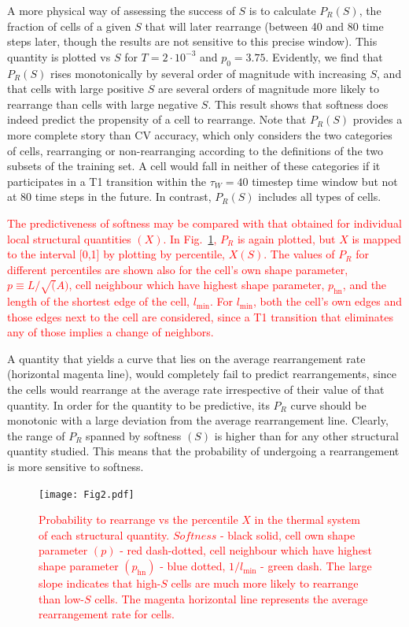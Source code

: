 \documentclass[twoside,twocolumn,9pt]{article}
\begin{document}
A more physical way of assessing the success of $S$ is to calculate $P_R(S)$, the fraction of cells of a given $S$ that will later rearrange (between 40 and 80 time steps later, though the results are not sensitive to this precise window). This quantity is plotted vs $S$ for $T=2 \cdot 10^{-3}$ and $p_0=3.75$. Evidently, we find that $P_R(S)$ rises monotonically by several order of magnitude with increasing $S$, and that cells with large positive $S$ are several orders of magnitude more likely to rearrange than cells with large negative $S$. This result shows that softness does indeed predict the propensity of a cell to rearrange. Note that
$P_R(S)$ provides a more complete story than CV accuracy, which only considers the two categories of cells, rearranging or non-rearranging according to the definitions of the two subsets of the training set.
A cell would fall in neither of these categories if it participates in a T1 transition within the $\tau_W=40$ timestep time window but not at 80 time steps in the future. In contrast, $P_R(S)$ includes all types of cells.

\textcolor{red}{
The predictiveness of softness may be compared with that obtained for individual local structural quantities $(X)$. In Fig.~\ref{Qpercentile}, $P_R$ is again plotted, but $X$ is mapped to the interval [0,1] by plotting by percentile, $X(S)$. The values of $P_R$ for different percentiles are shown also for the cell's own shape parameter, $p \equiv L / \sqrt(A)$, cell neighbour which have highest shape parameter, 
$p_\text{hn}$, and the length of the shortest edge of the cell, $l_\text{min}$. For $l_\text{min}$, both the cell's own edges and those edges next to the cell are considered, since a T1 transition that eliminates any of those implies a change of neighbors.}

A quantity that yields a curve that lies on the average rearrangement rate (horizontal magenta line), would completely fail to predict rearrangements, since the cells would rearrange at the average rate irrespective of their value of that quantity. In order for the quantity to be predictive, its $P_R$ curve should be monotonic with a large deviation from the average rearrangement line. Clearly, the range of $P_R$ spanned by softness $(S)$ is higher than for any other structural quantity studied. This means that the probability of undergoing a rearrangement is more sensitive to softness. 


\begin{figure}%
\centering
  \texttt{[image: Fig2.pdf]}
  \caption{\textcolor{red}{Probability to rearrange vs the percentile $X$ in the thermal system of each structural quantity. $Softness$ - black solid, cell own shape parameter $(p)$ - red dash-dotted, cell neighbour which have highest shape parameter $(p_\text{hn})$ - blue dotted, $1/l_\text{min}$ - green dash. The large slope indicates that high-$S$ cells are much more likely to rearrange than low-$S$ cells. The magenta horizontal line represents the average rearrangement rate for cells.}}
  \label{Qpercentile}
\end{figure}
\end{document}
